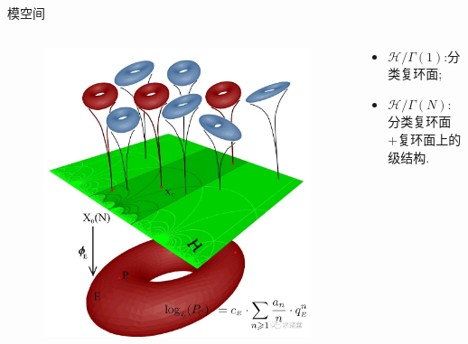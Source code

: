 \documentclass[pdf]{beamer}
\numberwithin{equation}{section}
\theoremstyle{plain}
\theoremstyle{plain}
\theoremstyle{remark}
\begin{document}
\begin{frame}{模空间}
\begin{columns}
	\begin{column}{0.5\textwidth}
		\begin{figure}[ht]
			\centering
			\includegraphics[height=.7\textheight]{fromweb/modularspace.jpg}
		\end{figure}
	\end{column}
	\begin{column}{0.5\textwidth}
		\begin{itemize}
			\item $\mathcal{H}/\Gamma(1)$:分类复环面;
			\item $\mathcal{H}/\Gamma(N)$:分类复环面+复环面上的级结构.
		\end{itemize}
	\end{column}
\end{columns}
\end{frame}
\end{document}
